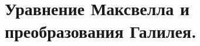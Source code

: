 \documentclass[12pt]{article}
\newcommand{\pt}{\partial}
\newcommand{\rot}{\mathrm{rot}\,}
\renewcommand{\div}{\mathrm{div}\,}
\newcommand{\vn}{\vec{\nabla}}
\begin{document}
\section{Уравнение Максвелла и преобразования Галилея.}










\end{document}
